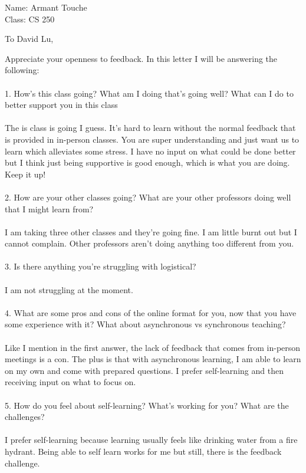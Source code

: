 \documentclass{letter}
\begin{document}
\begin{letter}{Name: Armant Touche \\ Class: CS 250 
\\ }
\opening{To David Lu,}

Appreciate your openness to feedback. In this letter I will be answering the following:\\\\
1. How's this class going?  What am I doing that's going well?  What can I do to better support you in this class\\\\
The is class is going I guess. It's hard to learn without the normal feedback that is provided in in-person classes. You are super understanding and just want us to learn which alleviates some stress. I have no input on what could be done better but I think just being supportive is good enough, which is what you are doing. Keep it up!\\\\
2. How are your other classes going?  What are your other professors doing well that I might learn from?\\\\
I am taking three other classes and they're going fine. I am little burnt out but I cannot complain. Other professors aren't doing anything too different from you.\\\\
3. Is there anything you're struggling with logistical?\\\\
I am not struggling at the moment.\\\\
4. What are some pros and cons of the online format for you, now that you have some experience with it?  What about asynchronous vs synchronous teaching?\\\\
Like I mention in the first answer, the lack of feedback that comes from in-person meetings is a con. The plus is that with asynchronous learning, I am able to learn on my own and come with prepared questions. I prefer self-learning and then receiving input on what to focus on.\\\\
5. How do you feel about self-learning?  What's working for you?  What are the challenges?\\\\
I prefer self-learning because learning usually feels like drinking water from a fire hydrant. Being able to self learn works for me but still, there is the feedback challenge.\\\\

\end{letter}
\end{document}
